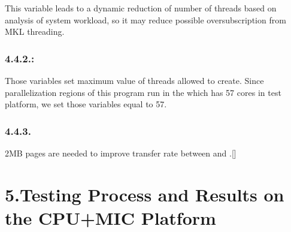 \documentclass{article}
\begin{document}
\noindent{}This variable leads to a dynamic reduction of number of  threads based on analysis of system workload, so it may reduce possible oversubscription from MKL threading.%

\subsubsection{4.4.2.\hspace*{0.5em}:}\label{sec-mkl_num_threads57-omp_num_threads57-}%

\noindent{}Those variables set maximum value of threads allowed to create. Since parallelization regions of this program run in the  which has 57 cores in test platform, we set those variables equal to 57.%

\subsubsection{4.4.3.\hspace*{0.5em}}\label{sec-mic_use_2mb_buffers64k}%

\noindent{}2MB pages are needed to improve transfer rate between  and .[]%

\section{5.\hspace*{0.5em}Testing Process and Results on the CPU+MIC Platform}\label{sec-testing-process-and-results-on-the-cpumic-platform}%
\end{document}
